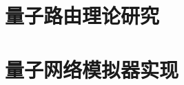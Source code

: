 \documentclass[degree=bachelor]{thuthesis}
\begin{document}
\maketitle

% 


\frontmatter


\tableofcontents


% 


\mainmatter

% 

\part{量子路由理论研究}





\part{量子网络模拟器实现}



% 
% 


% 


% 


% 

% 

% 

\end{document}
